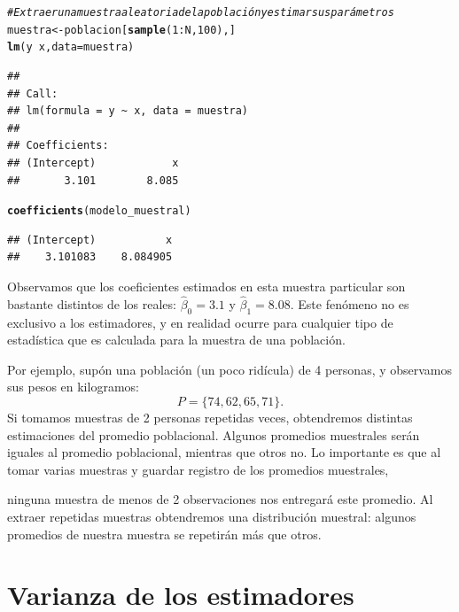 \documentclass[12pt]{report}\usepackage[]{graphicx}\usepackage[]{color}
\makeatletter
\newcommand{\hlnum}[1]{\textcolor[rgb]{0.686,0.059,0.569}{#1}}%
\newcommand{\hlcom}[1]{\textcolor[rgb]{0.678,0.584,0.686}{\textit{#1}}}%
\newcommand{\hlopt}[1]{\textcolor[rgb]{0,0,0}{#1}}%
\newcommand{\hlstd}[1]{\textcolor[rgb]{0.345,0.345,0.345}{#1}}%
\newcommand{\hlkwb}[1]{\textcolor[rgb]{0.69,0.353,0.396}{#1}}%
\newcommand{\hlkwc}[1]{\textcolor[rgb]{0.333,0.667,0.333}{#1}}%
\newcommand{\hlkwd}[1]{\textcolor[rgb]{0.737,0.353,0.396}{\textbf{#1}}}%
\newenvironment{kframe}{%
 \def\at@end@of@kframe{}%
 \ifinner\ifhmode%
  \def\at@end@of@kframe{\end{minipage}}%
  \begin{minipage}{\columnwidth}%
 \fi\fi%
 \def\FrameCommand##1{\hskip\@totalleftmargin \hskip-\fboxsep
 \colorbox{shadecolor}{##1}\hskip-\fboxsep
     \hskip-\linewidth \hskip-\@totalleftmargin \hskip\columnwidth}%
 \MakeFramed {\advance\hsize-\width
   \@totalleftmargin\z@ \linewidth\hsize
   \@setminipage}}%
 {\par\unskip\endMakeFramed%
 \at@end@of@kframe}
\newenvironment{knitrout}{}{} %
\makeatother
\begin{document}
\begin{knitrout}
\color{fgcolor}\begin{kframe}
\begin{alltt}
\hlcom{# Extraer una muestra aleatoria de la población y estimar sus parámetros}
\hlstd{muestra} \hlkwb{<-} \hlstd{poblacion[}\hlkwd{sample}\hlstd{(}\hlnum{1}\hlopt{:}\hlstd{N,} \hlnum{100}\hlstd{),]}
\hlkwd{lm}\hlstd{(y}\hlopt{~}\hlstd{x,} \hlkwc{data} \hlstd{= muestra)}
\end{alltt}
\begin{verbatim}
## 
## Call:
## lm(formula = y ~ x, data = muestra)
## 
## Coefficients:
## (Intercept)            x  
##       3.101        8.085
\end{verbatim}
\begin{alltt}
\hlkwd{coefficients}\hlstd{(modelo_muestral)}
\end{alltt}
\begin{verbatim}
## (Intercept)           x 
##    3.101083    8.084905
\end{verbatim}
\end{kframe}
\end{knitrout}

Observamos que los coeficientes estimados en esta muestra particular son bastante distintos de los reales: $\hat\beta_0 = 3.1$ y $\hat\beta_1 = 8.08$.
Este fenómeno no es exclusivo a los estimadores, y en realidad ocurre para cualquier tipo de estadística que es calculada para la muestra de una población.

Por ejemplo, supón una población (un poco ridícula) de 4 personas, y observamos sus pesos en kilogramos:
\begin{equation*}
P = \{74, 62, 65, 71\}.
\end{equation*}
Si tomamos muestras de 2 personas repetidas veces, obtendremos distintas estimaciones del promedio poblacional. Algunos promedios muestrales serán iguales al promedio poblacional, mientras que otros no. Lo importante es que al tomar varias muestras y guardar registro de los promedios muestrales,

ninguna muestra de menos de 2 observaciones nos entregará este promedio. Al extraer repetidas muestras obtendremos una distribución muestral: algunos promedios de nuestra muestra se repetirán más que otros.

\hrulefill



\section{Varianza de los estimadores}
\end{document}
